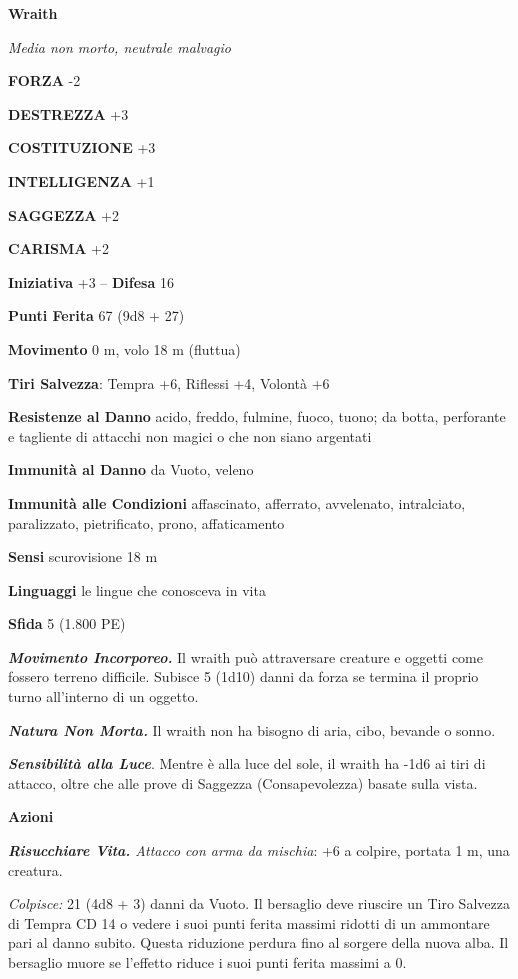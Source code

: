 \begin{multicols}{2}
\medskip{}\textbf{Wraith}

\emph{Media non morto, neutrale malvagio}

\textbf{FORZA} -2

\textbf{DESTREZZA} +3

\textbf{COSTITUZIONE} +3

\textbf{INTELLIGENZA} +1

\textbf{SAGGEZZA} +2

\textbf{CARISMA} +2

\textbf{Iniziativa} +3 -- \textbf{Difesa} 16

\textbf{Punti Ferita} 67 (9d8 + 27)

\textbf{Movimento} 0 m, volo 18 m (fluttua)

\textbf{Tiri Salvezza}: Tempra +6, Riflessi +4, Volontà +6

\textbf{Resistenze al Danno} acido, freddo, fulmine, fuoco, tuono; da botta, perforante e tagliente di attacchi non magici o che non siano argentati

\textbf{Immunità al Danno} da Vuoto, veleno

\textbf{Immunità alle Condizioni} affascinato, afferrato, avvelenato, intralciato, paralizzato, pietrificato, prono, affaticamento

\textbf{Sensi} scurovisione 18 m 

\textbf{Linguaggi} le lingue
che conosceva in vita 

\textbf{Sfida} 5 (1.800 PE)

\emph{\textbf{Movimento Incorporeo.}} Il wraith può attraversare creature e oggetti come fossero terreno difficile. Subisce 5 (1d10) danni da forza se termina il proprio turno all'interno di un oggetto.

\emph{\textbf{Natura Non Morta.}} Il wraith non ha bisogno di aria, cibo, bevande o sonno.

\emph{\textbf{Sensibilità alla Luce}}. Mentre è alla luce del sole, il wraith ha -1d6 ai tiri di attacco, oltre che alle prove di Saggezza (Consapevolezza) basate sulla vista.

\textbf{Azioni}

\emph{\textbf{Risucchiare Vita.} Attacco con arma da mischia}: +6 a colpire, portata 1 m, una creatura.

\emph{Colpisce:} 21 (4d8 + 3) danni da Vuoto. Il bersaglio deve riuscire un Tiro Salvezza di Tempra CD 14 o vedere i suoi punti ferita massimi ridotti di un ammontare pari al danno subito. Questa riduzione perdura fino al sorgere della nuova alba. Il bersaglio muore se l'effetto riduce i suoi punti ferita massimi a 0.


\end{multicols}
